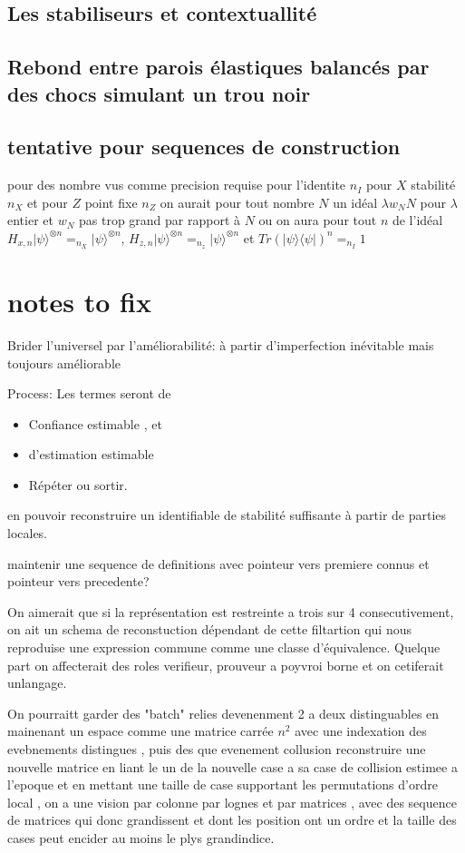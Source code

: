 \documentclass{article}
\newcommand{\ket}[1]{\ensuremath{|{#1}\rangle}}
\newcommand{\bra}[1]{\ensuremath{\langle{#1}}|}
\begin{document}
\subsection{Les stabiliseurs et contextuallité}
\subsection{ Rebond entre parois élastiques balancés par des chocs simulant un trou noir}
\subsection{tentative pour sequences de construction}
pour des nombre vus comme precision requise pour l'identite $n_I$ pour $X$ stabilité $n_X$ et pour $Z$ point fixe $n_Z$
on aurait pour tout nombre $N$ un idéal $\lambda w_N N$  pour $\lambda$ entier et $w_N$ pas trop grand par rapport à $N$
ou on aura pour tout $n$ de l'idéal $H_{x,n}\ket{ \psi}^{\otimes n}=_{n_X} \ket \psi^{\otimes n}$, $H_{z,n}\ket{ \psi}^{\otimes n}=_{n_z} \ket \psi ^{\otimes n}$ et $Tr(\ket \psi \bra \psi)^n=_{n_I}1$
 
 
\section{notes to fix }
Brider l'universel par l'améliorabilité: à partir d'imperfection inévitable mais toujours améliorable

Process: Les termes seront de 
\begin{itemize}
\item Confiance estimable , et
\item  d'estimation estimable
\item [ et d' estimation CLONE ligne précédente ]  Répéter ou sortir.									
\end{itemize}
en pouvoir reconstruire un identifiable de stabilité suffisante à partir de parties locales.

maintenir une sequence de definitions avec pointeur vers premiere connus et pointeur vers precedente?

On aimerait que si la représentation est restreinte a trois sur 4 consecutivement, on ait un schema de reconstuction dépendant de cette filtartion qui 
nous reproduise une expression commune comme une classe d'équivalence. Quelque part on affecterait des roles verifieur, prouveur a poyvroi borne et on cetiferait unlangage.

On pourraitt garder des "batch" relies devenenment 2 a deux distinguables en mainenant un espace comme une matrice carrée  $n^2$ avec une indexation
des evebnements distingues , puis des que evenement collusion reconstruire une nouvelle matrice en liant le un de la nouvelle case a sa case de collision estimee a l'epoque   et en mettant une taille de case supportant les permutations d'ordre local , on a une vision par colonne par lognes et par matrices , avec des sequence de matrices qui donc grandissent et dont les position ont un ordre et la taille des cases peut encider au moins le plys grandindice.
\end{document}
